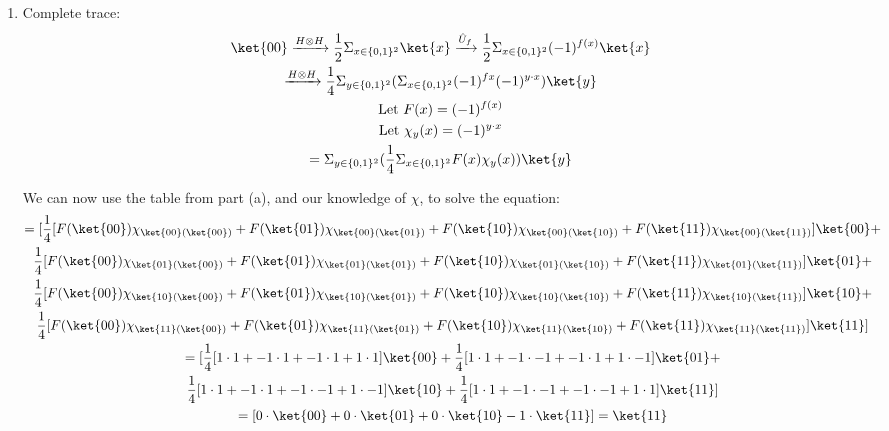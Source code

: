 \documentclass[]{article}
\begin{document}
\begin{enumerate}
\begin{enumerate}
          \item Complete trace:
            \begin{gather*}
              \ket{00} \xrightarrow{H \otimes H} \frac{1}{2}\Sigma_{x \in \{0,1\}^2} \ket{x}
              \xrightarrow{\hat{U}_f} \frac{1}{2}\Sigma_{x \in \{0,1\}^2} (-1)^{f(x)} \ket{x}\\
              \xrightarrow{H \otimes H} \frac{1}{4} \Sigma_{y \in \{0,1\}^2} (
              \Sigma_{x \in \{0,1\}^2} (-1)^{f{x}} (-1)^{y \cdot x}) \ket{y}\\
              \text{Let } F(x) = (-1)^{f(x)}\\
              \text{Let } \chi_y(x) = (-1)^{y \cdot x}\\
              =  \Sigma_{y \in \{0,1\}^2} (\frac{1}{4}
              \Sigma_{x \in \{0,1\}^2} F(x)\chi_y(x) ) \ket{y}\\
            \end{gather*}

            We can now use the table from part (a), and our knowledge of $\chi$, to solve the equation:
            \begin{gather*}
              = [\frac{1}{4}[
                F(\ket{00})\chi_{\ket{00}(\ket{00})}+
                F(\ket{01})\chi_{\ket{00}(\ket{01})}+
                F(\ket{10})\chi_{\ket{00}(\ket{10})}+
                F(\ket{11})\chi_{\ket{00}(\ket{11})}
              ]\ket{00}+ \\
              \frac{1}{4}[
                F(\ket{00})\chi_{\ket{01}(\ket{00})}+
                F(\ket{01})\chi_{\ket{01}(\ket{01})}+
                F(\ket{10})\chi_{\ket{01}(\ket{10})}+
                F(\ket{11})\chi_{\ket{01}(\ket{11})}
              ]\ket{01}+\\
              \frac{1}{4}[
                F(\ket{00})\chi_{\ket{10}(\ket{00})}+
                F(\ket{01})\chi_{\ket{10}(\ket{01})}+
                F(\ket{10})\chi_{\ket{10}(\ket{10})}+
                F(\ket{11})\chi_{\ket{10}(\ket{11})}             
              ]\ket{10}+\\
              \frac{1}{4}[
                F(\ket{00})\chi_{\ket{11}(\ket{00})}+
                F(\ket{01})\chi_{\ket{11}(\ket{01})}+
                F(\ket{10})\chi_{\ket{11}(\ket{10})}+
                F(\ket{11})\chi_{\ket{11}(\ket{11})}
              ]\ket{11}] \\
              = [
              \frac{1}{4}[1 \cdot 1 + -1 \cdot 1 + -1 \cdot 1 + 1 \cdot 1] \ket{00} + 
              \frac{1}{4}[1 \cdot 1 + -1 \cdot -1 + -1 \cdot 1 + 1 \cdot -1] \ket{01} +\\ 
              \frac{1}{4}[1 \cdot 1 + -1 \cdot 1 + -1 \cdot -1 + 1 \cdot -1] \ket{10} + 
              \frac{1}{4}[1 \cdot 1 + -1 \cdot -1 + -1 \cdot -1 + 1 \cdot 1] \ket{11}]\\
              = [0 \cdot \ket{00} + 0 \cdot \ket{01} + 0 \cdot \ket{10} - 1\cdot \ket{11}]
              = \ket{11}
            \end{gather*}


\end{enumerate}
\end{enumerate}
\end{document}
